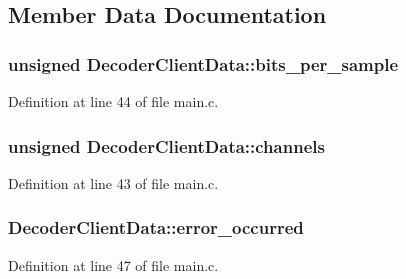 \subsection{Member Data Documentation}
\subsubsection[{\texorpdfstring{bits\+\_\+per\+\_\+sample}{bits_per_sample}}]{\setlength{\rightskip}{0pt plus 5cm}unsigned Decoder\+Client\+Data\+::bits\+\_\+per\+\_\+sample}\hypertarget{struct_decoder_client_data_a223609fa36d44fec5aef49aee5fdf095}{}\label{struct_decoder_client_data_a223609fa36d44fec5aef49aee5fdf095}


Definition at line 44 of file main.\+c.

\subsubsection[{\texorpdfstring{channels}{channels}}]{\setlength{\rightskip}{0pt plus 5cm}unsigned Decoder\+Client\+Data\+::channels}\hypertarget{struct_decoder_client_data_a97c807bb8c0974255fc26115dfbaf69c}{}\label{struct_decoder_client_data_a97c807bb8c0974255fc26115dfbaf69c}


Definition at line 43 of file main.\+c.

\subsubsection[{\texorpdfstring{error\+\_\+occurred}{error_occurred}}]{ Decoder\+Client\+Data\+::error\+\_\+occurred}\hypertarget{struct_decoder_client_data_af674c1095df5e045ec4cea9266de84f5}{}\label{struct_decoder_client_data_af674c1095df5e045ec4cea9266de84f5}


Definition at line 47 of file main.\+c.


